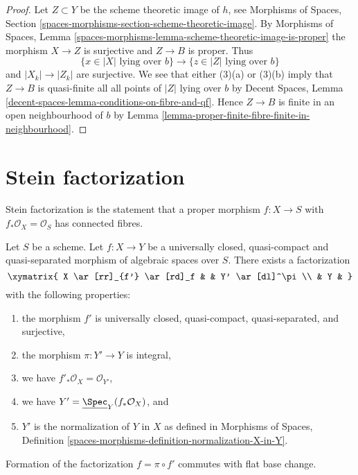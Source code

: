 \begin{proof}
Let $Z \subset Y$ be the scheme theoretic image of $h$, see
Morphisms of Spaces, Section
\ref{spaces-morphisms-section-scheme-theoretic-image}.
By Morphisms of Spaces, Lemma
\ref{spaces-morphisms-lemma-scheme-theoretic-image-is-proper}
the morphism $X \to Z$ is surjective and $Z \to B$ is proper.
Thus
$$
\{x \in |X|\text{ lying over }b\} \to
\{z \in |Z|\text{ lying over }b\}
$$
and $|X_k| \to |Z_k|$ are surjective. We see that either
(3)(a) or (3)(b) imply that $Z \to B$ is quasi-finite
all all points of $|Z|$ lying over $b$ by
Decent Spaces, Lemma \ref{decent-spaces-lemma-conditions-on-fibre-and-qf}.
Hence $Z \to B$ is finite in an open neighbourhood of $b$ by
Lemma \ref{lemma-proper-finite-fibre-finite-in-neighbourhood}.
\end{proof}







\section{Stein factorization}
\label{section-stein-factorization}

\noindent
Stein factorization is the statement that a proper morphism $f : X \to S$
with $f_*\mathcal{O}_X = \mathcal{O}_S$ has connected fibres.

\begin{lemma}
\label{lemma-stein-universally-closed}
Let $S$ be a scheme.
Let $f : X \to Y$ be a universally closed, quasi-compact and
quasi-separated morphism of algebraic spaces over $S$.
There exists a factorization
$$
\xymatrix{
X \ar[rr]_{f'} \ar[rd]_f & & Y' \ar[dl]^\pi \\
& Y &
}
$$
with the following properties:
\begin{enumerate}
\item the morphism $f'$ is universally closed, quasi-compact, quasi-separated,
and surjective,
\item the morphism $\pi : Y' \to Y$ is integral,
\item we have $f'_*\mathcal{O}_X = \mathcal{O}_{Y'}$,
\item we have $Y' = \underline{\Spec}_Y(f_*\mathcal{O}_X)$, and
\item $Y'$ is the normalization of $Y$ in $X$ as defined in
Morphisms of Spaces, Definition
\ref{spaces-morphisms-definition-normalization-X-in-Y}.
\end{enumerate}
Formation of the factorization $f = \pi \circ f'$ commutes with flat
base change.
\end{lemma}

